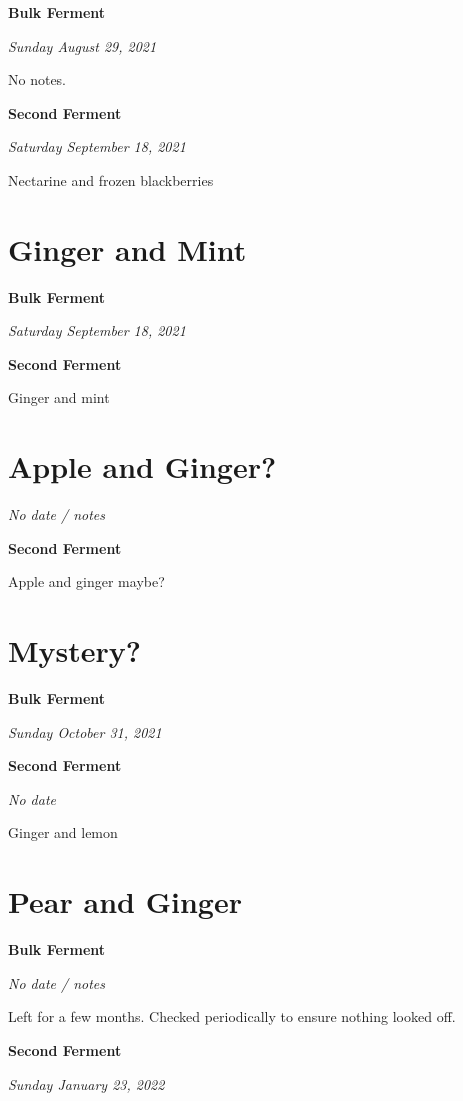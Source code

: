 \documentclass[
]{book}
\begin{document}
\textbf{Bulk Ferment}

\emph{Sunday August 29, 2021}

No notes.

\textbf{Second Ferment}

\emph{Saturday September 18, 2021}

Nectarine and frozen blackberries

\hypertarget{ginger-and-mint}{%
\section{Ginger and Mint}\label{ginger-and-mint}}

\textbf{Bulk Ferment}

\emph{Saturday September 18, 2021}

\textbf{Second Ferment}

Ginger and mint

\hypertarget{apple-and-ginger}{%
\section{Apple and Ginger?}\label{apple-and-ginger}}

\emph{No date / notes}

\textbf{Second Ferment}

Apple and ginger maybe?

\hypertarget{mystery}{%
\section{Mystery?}\label{mystery}}

\textbf{Bulk Ferment}

\emph{Sunday October 31, 2021}

\textbf{Second Ferment}

\emph{No date}

Ginger and lemon

\hypertarget{pear-and-ginger}{%
\section{Pear and Ginger}\label{pear-and-ginger}}

\textbf{Bulk Ferment}

\emph{No date / notes}

Left for a few months. Checked periodically to ensure nothing looked off.

\textbf{Second Ferment}

\emph{Sunday January 23, 2022}
\end{document}
